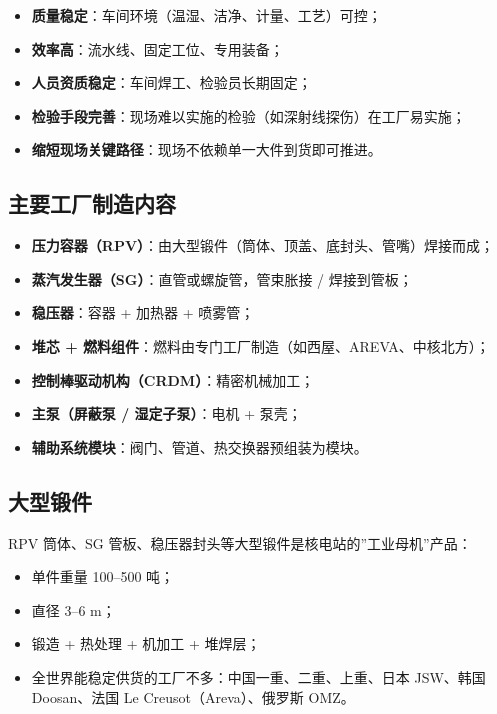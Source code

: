 \documentclass[
  UTF8,
  scheme=plain,
  fontsize=10pt,
  openany
]{ctexbook}
\begin{document}
\begin{itemize}
\tightlist
\item
  \textbf{质量稳定}：车间环境（温湿、洁净、计量、工艺）可控；
\item
  \textbf{效率高}：流水线、固定工位、专用装备；
\item
  \textbf{人员资质稳定}：车间焊工、检验员长期固定；
\item
  \textbf{检验手段完善}：现场难以实施的检验（如深射线探伤）在工厂易实施；
\item
  \textbf{缩短现场关键路径}：现场不依赖单一大件到货即可推进。
\end{itemize}

\subsection{主要工厂制造内容}\label{ux4e3bux8981ux5de5ux5382ux5236ux9020ux5185ux5bb9}

\begin{itemize}
\tightlist
\item
  \textbf{压力容器（RPV）}：由大型锻件（筒体、顶盖、底封头、管嘴）焊接而成；
\item
  \textbf{蒸汽发生器（SG）}：直管或螺旋管，管束胀接 / 焊接到管板；
\item
  \textbf{稳压器}：容器 + 加热器 + 喷雾管；
\item
  \textbf{堆芯 +
  燃料组件}：燃料由专门工厂制造（如西屋、AREVA、中核北方）；
\item
  \textbf{控制棒驱动机构（CRDM）}：精密机械加工；
\item
  \textbf{主泵（屏蔽泵 / 湿定子泵）}：电机 + 泵壳；
\item
  \textbf{辅助系统模块}：阀门、管道、热交换器预组装为模块。
\end{itemize}

\subsection{大型锻件}\label{ux5927ux578bux953bux4ef6}

RPV 筒体、SG 管板、稳压器封头等大型锻件是核电站的''工业母机''产品：

\begin{itemize}
\tightlist
\item
  单件重量 100--500 吨；
\item
  直径 3--6 m；
\item
  锻造 + 热处理 + 机加工 + 堆焊层；
\item
  全世界能稳定供货的工厂不多：中国一重、二重、上重、日本 JSW、韩国
  Doosan、法国 Le Creusot（Areva）、俄罗斯 OMZ。
\end{itemize}
\end{document}
